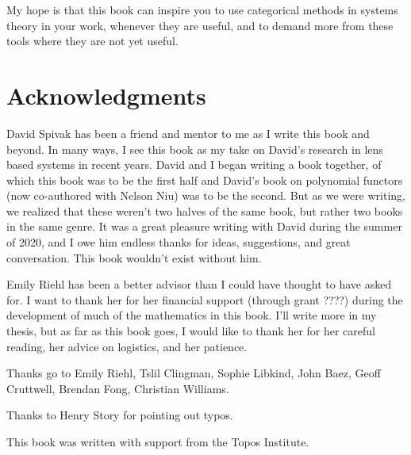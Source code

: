 \documentclass[DynamicalBook]{subfiles}
\begin{document}
My hope is that this book can inspire you to use categorical methods in systems theory in your work, whenever they are useful, and to demand more from these tools where they are not yet useful.







\section*{Acknowledgments}

David Spivak has been a friend and mentor to me as I write this book and beyond.
In many ways, I see this book as my take on David's research in lens based
systems in recent years. David and I began writing a book together, of which
this book was to be the first half and David's book on polynomial functors (now
co-authored with Nelson Niu) was to be the second. But as we were writing, we
realized that these weren't two halves of the same book, but rather two books
in the same genre. It was a great pleasure writing with David during the summer
of 2020, and I owe him endless thanks for ideas, suggestions, and great
conversation. This book wouldn't exist without him.

Emily Riehl has been a better advisor than I could have thought to have asked for. I want to thank her for her financial support (through grant ????) during the development of much of the mathematics in this book. I'll write more in my thesis, but as far as this book goes, I would like to thank her for her careful reading, her advice on logistics, and her patience.

Thanks go to Emily Riehl, Tslil Clingman, Sophie Libkind, John Baez, Geoff Cruttwell, Brendan
Fong, Christian Williams.

Thanks to Henry Story for pointing out typos.

This book was written with support from the Topos Institute.
\end{document}
